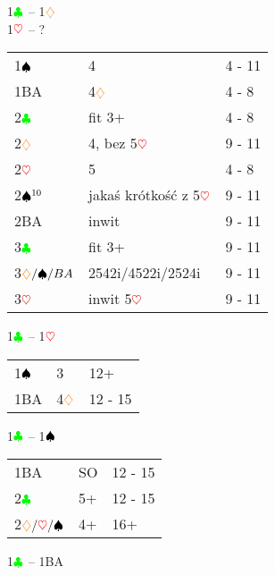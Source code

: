 \documentclass[a4paper,11pt]{article}
\newcommand{\CC}{\textcolor{green}\clubsuit}
\newcommand{\DD}{\textcolor{orange}\diamondsuit}
\newcommand{\HH}{\textcolor{red}\heartsuit}
\newcommand{\PP}{\textcolor{black}\spadesuit}
\begin{document}
\begin{center}\LARGE{1$\CC$ -- 1$\DD$\\1$\HH$ -- ?}\\
\end{center}
\begin{tabular}{p{2cm} p{10cm} l}
	1$\PP$ & 4 & 4 - 11\\
	1BA\footnotemark[9] & 4$\DD$ & 4 - 8\\
	2$\CC$ & fit 3+ & 4 - 8\\
	2$\DD$ & 4, bez 5$\HH$ & 9 - 11\\
	2$\HH$ & 5 & 4 - 8\\
	2$\PP\footnotemark[10]$ & jakaś krótkość z 5$\HH$ & 9 - 11\\
	2BA & inwit & 9 - 11\\
	3$\CC$ & fit 3+ & 9 - 11\\
	3$\DD/\PP/BA$ & 2542i/4522i/2524i & 9 - 11\\
	3$\HH$ & inwit 5$\HH$ & 9 - 11\\
\end{tabular}

\newpage

\begin{center}\LARGE{1$\CC$ -- 1$\HH$}\\
\end{center}

\begin{tabular}{p{2cm} p{10cm} l}
	1$\PP$ & 3 & 12+\\
	1BA & 4$\DD$ & 12 - 15\\
\end{tabular}

\begin{center}\LARGE{1$\CC$ -- 1$\PP$}\\
\end{center}

\begin{tabular}{p{2cm} p{10cm} l}
	1BA & SO & 12 - 15\\
	2$\CC$ & 5+ & 12 - 15\\
	2$\DD/\HH/\PP$ & 4+ & 16+\\
\end{tabular}

\begin{center}\LARGE{1$\CC$ -- 1BA\footnotemark[1]}
\end{center}

\begin{tabular}{p{2cm} p{10cm} l}
	
\end{tabular}
\end{document}
